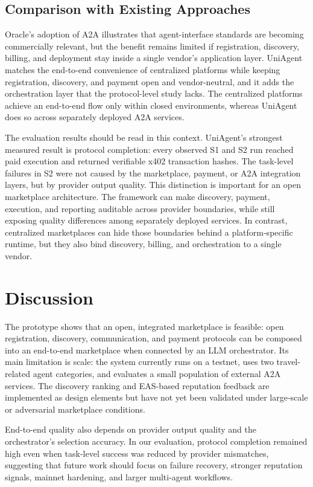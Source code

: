 \documentclass[sigconf]{acmart}
\begin{document}
\subsection{Comparison with Existing Approaches}
Oracle's adoption of A2A illustrates that agent-interface standards are becoming
commercially relevant, but the benefit remains limited if registration,
discovery, billing, and deployment stay inside a single vendor's
application layer. UniAgent matches the end-to-end
convenience of centralized platforms while keeping registration,
discovery, and payment open and vendor-neutral, and it adds the
orchestration layer that the protocol-level study lacks. The centralized
platforms achieve an end-to-end flow only within closed environments,
whereas UniAgent does so across separately deployed A2A services.

The evaluation results should be read in this context. UniAgent's
strongest measured result is protocol completion: every observed S1 and
S2 run reached paid execution and returned verifiable x402 transaction
hashes. The task-level failures in S2 were not caused by the marketplace,
payment, or A2A integration layers, but by provider output quality. This
distinction is important for an open marketplace architecture. The
framework can make discovery, payment, execution, and reporting
auditable across provider boundaries, while still exposing quality
differences among separately deployed services. In contrast, centralized
marketplaces can hide those boundaries behind a platform-specific
runtime, but they also bind discovery, billing, and orchestration to a
single vendor.

\section{Discussion}
\label{sec:discussion}

The prototype shows that an open, integrated marketplace is feasible:
open registration, discovery, communication, and payment protocols can
be composed into an end-to-end marketplace when connected by an LLM
orchestrator. Its main limitation is scale: the system currently runs on
a testnet, uses two travel-related agent categories, and evaluates a
small population of external A2A services. The discovery ranking and
EAS-based reputation feedback are implemented as design elements but
have not yet been validated under large-scale or adversarial marketplace
conditions.

End-to-end quality also depends on provider output quality and the
orchestrator's selection accuracy. In our evaluation, protocol
completion remained high even when task-level success was reduced by
provider mismatches, suggesting that future work should focus on failure
recovery, stronger reputation signals, mainnet hardening, and larger
multi-agent workflows.
\end{document}
